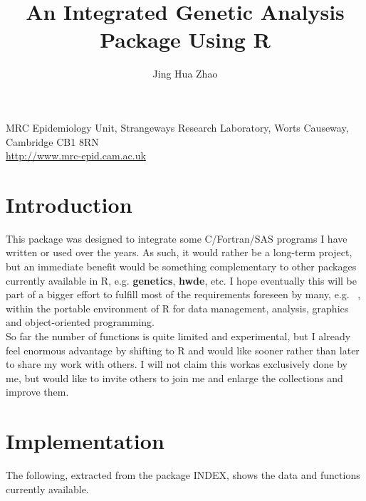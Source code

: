 \documentclass[11pt,a4paper]{article}
\begin{document}
\title{An Integrated Genetic Analysis Package Using R}
\author{Jing Hua Zhao}
\date{}
\maketitle

\begin{center}
MRC Epidemiology Unit, Strangeways Research Laboratory, Worts Causeway, Cambridge CB1 8RN\\
\url{http://www.mrc-epid.cam.ac.uk}
\end{center}

\tableofcontents



\section{Introduction}

This package was designed to integrate some C/Fortran/SAS programs I have written 
or used over the years. As such, it would rather be a long-term project, but an
immediate benefit would be something complementary to other packages currently
available in R, e.g. {\bf genetics}, {\bf hwde}, etc. I hope eventually this will
be part of a bigger effort to fulfill most of the requirements foreseen by many, 
e.g. ~\cite{guo00}, within the portable environment of R for data management, 
analysis, graphics and object-oriented programming. \\

So far the number of functions is quite limited and experimental, but I already
feel enormous advantage by shifting to R and would like sooner rather than later
to share my work with others. I will not claim this workas exclusively done by
me, but would like to invite others to join me and enlarge the collections and
improve them.


\section{Implementation}

The following, extracted from the package INDEX, shows the data and functions
currently available.
\end{document}
